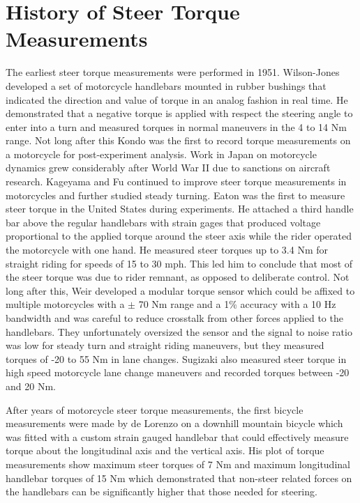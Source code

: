\documentclass[a4paper]{article}
\begin{document}
\section*{History of Steer Torque Measurements}

The earliest steer torque measurements were performed
 in 1951. Wilson-Jones  \cite{Wilson-Jones1951} developed a set of motorcycle
handlebars mounted in rubber bushings that indicated the direction and
value of torque in an analog fashion in real time. He demonstrated that a 
negative torque is applied with respect the steering angle to enter into a turn
and measured torques in normal maneuvers in the 4 to 14 Nm range. Not long
after this Kondo \cite{Kondo1955} was the first to record torque measurements on a
motorcycle for post-experiment analysis. Work in Japan on motorcycle dynamics
grew considerably after World War II due to sanctions on aircraft research.
Kageyama \cite{Kageyama1959} and Fu \cite{Fu1965} continued to improve steer torque
measurements in motorcycles and further studied steady turning.
Eaton \cite{Eaton1973} was the first to measure steer torque in the United
States during experiments. He attached a third handle bar above the regular
handlebars with strain gages that produced voltage proportional to the applied
torque around the steer axis while the rider operated the motorcycle with one hand.
He measured steer torques up to 3.4 Nm for straight riding for speeds of 15
to 30 mph. This led him to conclude that most of the steer torque was due to
rider remnant, as opposed to deliberate control. Not long after this,
Weir \cite{Weir1979a} developed a modular torque sensor which could be affixed to
multiple motorcycles with a $\pm$ 70 Nm range and a 1\% accuracy with a 10 Hz
bandwidth and was careful to reduce crosstalk from other forces applied to
the handlebars. They unfortunately oversized the sensor and the signal to noise
ratio was low for steady turn and straight riding maneuvers, but they measured
torques of -20 to 55 Nm in lane changes. Sugizaki \cite{Sugizaki1988} also measured steer
torque in high speed motorcycle lane change maneuvers and recorded torques
between -20 and 20 Nm.

After years of motorcycle steer torque measurements, the first bicycle
measurements were made by de Lorenzo \cite{Lorenzo1997} on a downhill mountain bicycle
which was fitted with a custom strain gauged handlebar that could effectively
measure torque about the longitudinal axis and the vertical axis. His plot of
torque measurements show maximum steer torques of 7 Nm and maximum longitudinal
handlebar torques of 15 Nm which demonstrated that non-steer related forces on
the handlebars can be significantly higher that those needed for steering.
\end{document}
